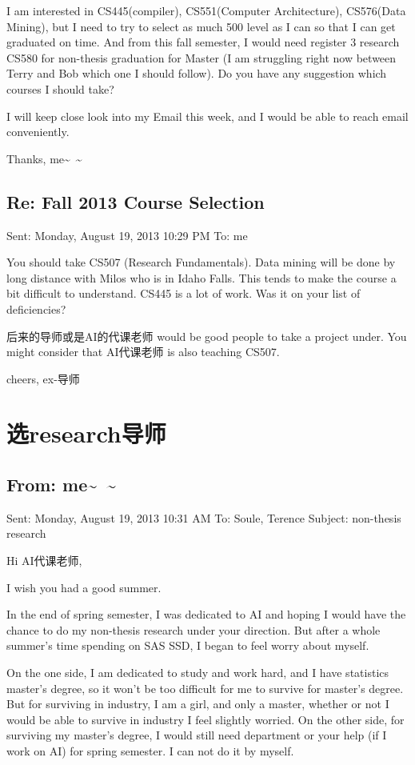 \documentclass[12pt]{book}
\begin{document}
I am interested in CS445(compiler), CS551(Computer Architecture), CS576(Data Mining), but I need to try to select as much 500 level as I can so that I can get graduated on time. And from this fall semester, I would need register 3 research CS580 for non-thesis graduation for Master (I am struggling right now between Terry and Bob which one I should follow). Do you have any suggestion which courses I should take?

I will keep close look into my Email this week, and I would be able to reach email conveniently. 

Thanks,
me\textasciitilde{}~\textasciitilde{}

\subsection{Re: Fall 2013 Course Selection}
\label{sec-8-1-2}
Sent: Monday, August 19, 2013 10:29 PM
To: me

You should take CS507 (Research Fundamentals).  Data mining will be done by long distance with Milos who is in Idaho Falls.  This tends to make the course a bit difficult to understand.  CS445 is a lot of work.  Was it on your list of deficiencies?

后来的导师或是AI的代课老师 would be good people to take a project under.   You might consider that AI代课老师 is also teaching CS507.

cheers,
ex-导师

\section{选research导师}
\label{sec-8-2}

\subsection{From: me\textasciitilde{}~\textasciitilde{}}
\label{sec-8-2-1}
Sent: Monday, August 19, 2013 10:31 AM
To: Soule, Terence
Subject: non-thesis research

Hi AI代课老师, 

I wish you had a good summer. 

In the end of spring semester, I was dedicated to AI and hoping I would have the chance to do my non-thesis research under your direction. But after a whole summer's time spending on SAS SSD, I began to feel worry about myself. 

On the one side, I am dedicated to study and work hard, and I have statistics master's degree, so it won't be too difficult for me to survive for master's degree. But for surviving in industry, I am a girl, and only a master, whether or not I would be able to survive in industry I feel slightly worried. On the other side, for surviving my master's degree, I would still need department or your help (if I work on AI) for spring semester. I can not do it by myself. 
\end{document}
